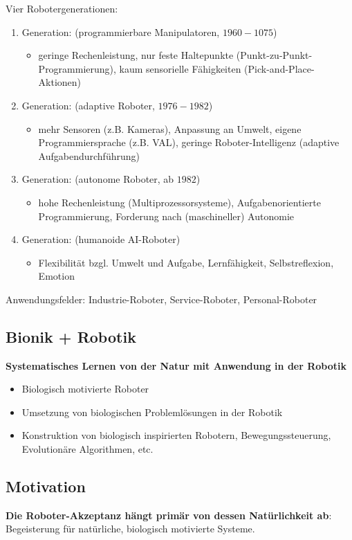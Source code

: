 Vier Robotergenerationen:
\begin{enumerate}
	\item Generation: (programmierbare Manipulatoren, $1960 - 1075$)
	\begin{itemize}
		\item geringe Rechenleistung, nur feste Haltepunkte (Punkt-zu-Punkt-Programmierung), kaum sensorielle Fähigkeiten (Pick-and-Place-Aktionen)
	\end{itemize}
	\item Generation: (adaptive Roboter, $1976 - 1982$)
	\begin{itemize}
		\item mehr Sensoren (z.B. Kameras), Anpassung an Umwelt, eigene Programmiersprache (z.B. VAL), geringe Roboter-Intelligenz (adaptive Aufgabendurchführung)
	\end{itemize}
	\item Generation: (autonome Roboter, ab $1982$)
	\begin{itemize}
		\item hohe Rechenleistung (Multiprozessorsysteme), Aufgabenorientierte Programmierung, Forderung nach (maschineller) Autonomie
	\end{itemize}
	\item Generation: (humanoide AI-Roboter)
	\begin{itemize}
		\item Flexibilität bzgl. Umwelt und Aufgabe, Lernfähigkeit, Selbstreflexion, Emotion
	\end{itemize}
\end{enumerate}
Anwendungsfelder: Industrie-Roboter, Service-Roboter, Personal-Roboter

\subsection{Bionik + Robotik}
\textbf{Systematisches Lernen von der Natur mit Anwendung in der Robotik}
\begin{itemize}
	\item Biologisch motivierte Roboter
	\item Umsetzung von biologischen Problemlösungen in der Robotik
	\item Konstruktion von biologisch inspirierten Robotern, Bewegungssteuerung, Evolutionäre Algorithmen, etc.\
\end{itemize}

\subsection{Motivation}
\textbf{Die Roboter-Akzeptanz hängt primär von dessen Natürlichkeit ab}: Begeisterung für natürliche, biologisch motivierte Systeme. \\


